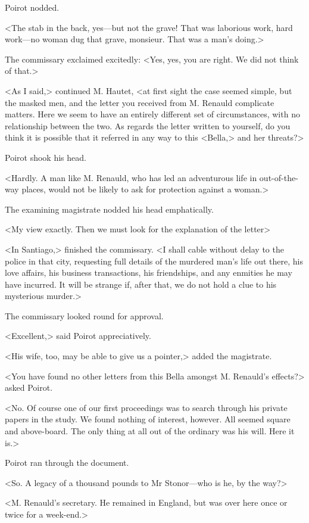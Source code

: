  Poirot nodded. 

 <The stab in the back, yes—but not the grave! That was laborious work, hard work—no woman dug that grave, monsieur. That was a man's doing.> 

 The commissary exclaimed excitedly: <Yes, yes, you are right. We did not think of that.> 

 <As I said,> continued M. Hautet, <at first sight the case seemed simple, but the masked men, and the letter you received from M. Renauld complicate matters. Here we seem to have an entirely different set of circumstances, with no relationship between the two. As regards the letter written to yourself, do you think it is possible that it referred in any way to this <Bella,> and her threats?> 

 Poirot shook his head. 

 <Hardly. A man like M. Renauld, who has led an adventurous life in out-of-the-way places, would not be likely to ask for protection against a woman.> 

 The examining magistrate nodded his head emphatically. 

 <My view exactly. Then we must look for the explanation of the letter\longdash> 

 <In Santiago,> finished the commissary. <I shall cable without delay to the police in that city, requesting full details of the murdered man's life out there, his love affairs, his business transactions, his friendships, and any enmities he may have incurred. It will be strange if, after that, we do not hold a clue to his mysterious murder.> 

 The commissary looked round for approval. 

 <Excellent,> said Poirot appreciatively. 

 <His wife, too, may be able to give us a pointer,> added the magistrate. 

 <You have found no other letters from this Bella amongst M. Renauld's effects?> asked Poirot. 

 <No. Of course one of our first proceedings was to search through his private papers in the study. We found nothing of interest, however. All seemed square and above-board. The only thing at all out of the ordinary was his will. Here it is.> 

 Poirot ran through the document. 

 <So. A legacy of a thousand pounds to Mr Stonor—who is he, by the way?> 

 <M. Renauld's secretary. He remained in England, but was over here once or twice for a week-end.> 

